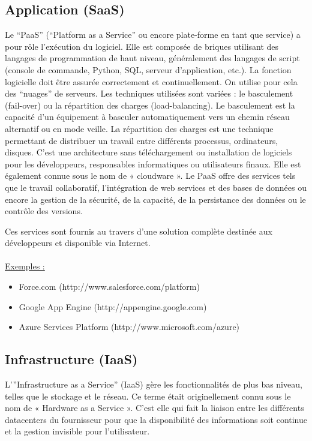 \documentclass[a4paper,12pt]{report}
\begin{document}
\begin{onehalfspace}
	\subsection{Application (SaaS)}
	Le “PaaS” (“Platform as a Service” ou encore plate-forme en tant que service) a pour rôle l’exécution du logiciel. Elle est composée de briques utilisant des langages de programmation de haut niveau, généralement des langages de script (console de commande, Python, SQL, serveur d'application, etc.). La fonction logicielle doit être assurée correctement et continuellement. On utilise pour cela des “nuages” de serveurs. Les techniques utilisées sont variées : le basculement (fail-over) ou la répartition des charges (load-balancing). Le basculement est la capacité d’un équipement à basculer automatiquement vers un chemin réseau alternatif ou en mode veille. La répartition des charges est une technique permettant de distribuer un travail entre différents processus, ordinateurs, disques. C'est une architecture sans téléchargement ou installation de logiciels pour les développeurs, responsables informatiques ou utilisateurs finaux. Elle est également connue sous le nom de « cloudware ». Le PaaS offre des services tels que le travail collaboratif, l’intégration de web services et des bases de données ou encore la gestion de la sécurité, de la capacité, de la persistance des données ou le contrôle des versions.
	
	Ces services sont fournis au travers d’une solution complète destinée aux développeurs et disponible via Internet.
	
	\paragraph*{}
	\underline{Exemples :}
	\begin{itemize}
		\item Force.com (http://www.salesforce.com/platform)
		\item Google App Engine (http://appengine.google.com)
		\item Azure Services Platform (http://www.microsoft.com/azure)
	\end{itemize}
	
	\subsection{Infrastructure (IaaS)}
	L’”Infrastructure as a Service” (IaaS) gère les fonctionnalités de plus bas niveau, telles que le stockage et le réseau. Ce terme était originellement connu sous le nom de « Hardware as a Service ». C’est elle qui fait la liaison entre les différents datacenters du fournisseur pour que la disponibilité des informations soit continue et la gestion invisible pour l’utilisateur.
	

\end{onehalfspace}
\end{document}
